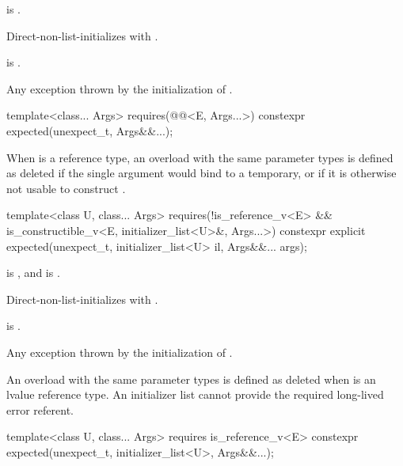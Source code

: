 \begin{itemdescr}
\pnum
\constraints
{} is .

\pnum
\effects
Direct-non-list-initializes  with .

\pnum
\ensures
{} is .

\pnum
\throws
Any exception thrown by the initialization of .
\end{itemdescr}

%
\begin{itemdecl}
template<class... Args>
  requires(@@<E, Args...>)
constexpr expected(unexpect_t, Args&&...);
\end{itemdecl}

\begin{itemdescr}
\pnum
\remarks
When  is a reference type, an overload with the same parameter types is defined as deleted if the single argument would bind  to a temporary, or if it is otherwise not usable to construct .
\end{itemdescr}

%
\begin{itemdecl}
template<class U, class... Args>
  requires(!is_reference_v<E> && is_constructible_v<E, initializer_list<U>&, Args...>)
constexpr explicit expected(unexpect_t, initializer_list<U> il, Args&&... args);
\end{itemdecl}

\begin{itemdescr}
\pnum
\constraints
{} is , and  is .

\pnum
\effects
Direct-non-list-initializes  with .

\pnum
\ensures
{} is .

\pnum
\throws
Any exception thrown by the initialization of .

\pnum
\remarks
An overload with the same parameter types is defined as deleted when  is an lvalue reference type. An initializer list cannot provide the required long-lived error referent.
\end{itemdescr}

%
\begin{itemdecl}
template<class U, class... Args>
  requires is_reference_v<E>
constexpr expected(unexpect_t, initializer_list<U>, Args&&...);
\end{itemdecl}

